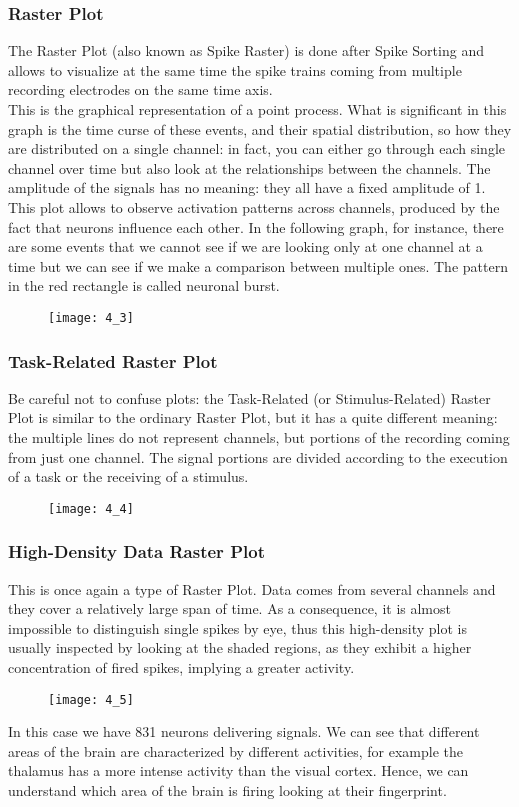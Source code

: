 \subsubsection{Raster Plot}
The Raster Plot (also known as Spike Raster) is done after Spike Sorting and allows to visualize at the same time the spike trains coming from multiple recording electrodes on the same time axis.\\
This is the graphical representation of a point process. What is significant in this graph is the time curse of these events, and their spatial distribution, so how they are distributed on a single channel: in fact, you can either go through each single channel over time but also look at the relationships between the channels. The amplitude of the signals has no meaning: they all have a fixed amplitude of 1.\\
This plot allows to observe activation patterns across channels, produced by the fact that neurons influence each other. In the following graph, for instance, there are some events that we cannot see if we are looking only at one channel at a time but we can see if we make a comparison between multiple ones. The pattern in the red rectangle is called neuronal burst.
\begin{figure}[H]
    \texttt{[image: 4\_3]}
    \centering
\end{figure}
\subsubsection{Task-Related Raster Plot}
Be careful not to confuse plots: the Task-Related (or Stimulus-Related) Raster Plot is similar to the ordinary Raster Plot, but it has a quite different meaning: the multiple lines do not represent channels, but portions of the recording coming from just one channel. The signal portions are divided according to the execution of a task or the receiving of a stimulus.
\begin{figure}[H]
    \texttt{[image: 4\_4]}
    \centering
\end{figure}
\subsubsection{High-Density Data Raster Plot}
This is once again a type of Raster Plot. Data comes from several channels and they cover a relatively
large span of time. As a consequence, it is almost impossible to distinguish single spikes by eye,
thus this high-density plot is usually inspected by looking at the shaded regions, as they exhibit a
higher concentration of fired spikes, implying a greater activity.
\begin{figure}[H]
    \texttt{[image: 4\_5]}
    \centering
\end{figure}
In this case we have 831 neurons delivering signals. We can see that different areas of the brain are characterized by different activities, for example the thalamus has a more intense activity than the visual cortex. Hence, we can understand which area of the brain is firing looking at their fingerprint.
